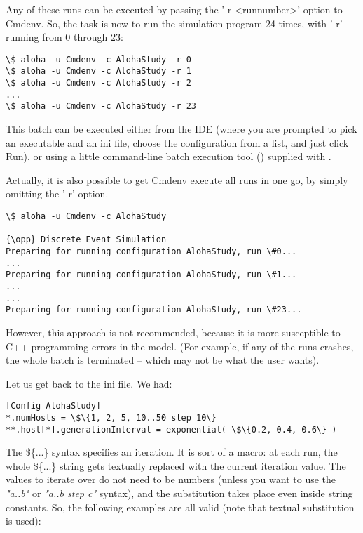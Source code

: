 Any of these runs can be executed by passing the '-r
<runnumber>' option to Cmdenv.
So, the task is now to run the simulation program 24 times, with
'-r' running from 0 through 23:

\begin{Verbatim}[commandchars=\\\{\}]
\$ aloha -u Cmdenv -c AlohaStudy -r 0
\$ aloha -u Cmdenv -c AlohaStudy -r 1
\$ aloha -u Cmdenv -c AlohaStudy -r 2
...
\$ aloha -u Cmdenv -c AlohaStudy -r 23
\end{Verbatim}


This batch can be executed either from the {\opp} IDE (where you are
prompted to pick an executable and an ini file, choose the configuration
from a list, and just click Run), or using a little command-line
batch execution tool () supplied with {\opp}.

Actually, it is also possible to get Cmdenv execute all runs in one go,
by simply omitting the '-r' option.


\begin{Verbatim}[commandchars=\\\{\}]
\$ aloha -u Cmdenv -c AlohaStudy

{\opp} Discrete Event Simulation
Preparing for running configuration AlohaStudy, run \#0...
...
Preparing for running configuration AlohaStudy, run \#1...
...
...
Preparing for running configuration AlohaStudy, run \#23...
\end{Verbatim}


However, this approach is not recommended, because it is more
susceptible to C++ programming errors in the model. (For example, if
any of the runs crashes, the whole batch is terminated -- which may
not be what the user wants).

Let us get back to the ini file. We had:

\begin{Verbatim}[commandchars=\\\{\}]
[Config AlohaStudy]
*.numHosts = \$\{1, 2, 5, 10..50 step 10\}
**.host[*].generationInterval = exponential( \$\{0.2, 0.4, 0.6\} )
\end{Verbatim}


The \$\{...\} syntax specifies an iteration. It is sort of a macro: at
each run, the whole \$\{...\} string gets textually replaced with the
current iteration value. The values to iterate over do not need to be
numbers (unless you want to use the \textit{"a..b"} or
\textit{"a..b step c"} syntax), and the
substitution takes place even inside string constants. So, the
following examples are all valid (note that textual substitution is
used):

